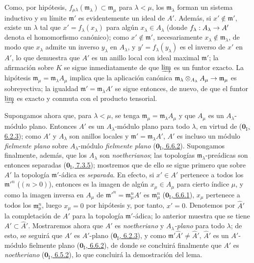 \documentclass[10pt,oneside,openany]{book}
\theoremstyle{egaenv}\newtheorem*{env}{---}
\theoremstyle{egastatement}
\theoremstyle{egadescription}
\newcommand{\oldpage}[2][]{\marginnote{\normalfont\scriptsize\textbf{#1}\,|\,#2}\ignorespaces}
\renewcommand{\to}{\mathchoice{\longrightarrow}{\rightarrow}{\rightarrow}{\rightarrow}}
\begin{document}
Como, por hipótesis, $f_{\mu\lambda}(\mathfrak m_\lambda)\subset\mathfrak m_\mu$ para $\lambda<\mu$, los $\mathfrak m_\lambda$ forman un sistema inductivo y su límite $\mathfrak m'$ es evidentemente un ideal de $A'$.
Además, si $x'\notin\mathfrak m'$, existe un $\lambda$ tal que $x'=f_\lambda(x_\lambda)$ para algún $x_\lambda\in A_\lambda$ (donde $f_\lambda:A_\lambda\to A'$ denota el homomorfismo canónico);
como $x'\notin\mathfrak m'$, necesariamente $x_\lambda\notin\mathfrak m_\lambda$, de modo que $x_\lambda$ admite un inverso $y_\lambda$ en $A_\lambda$, y $y'=f_\lambda(y_\lambda)$ es el inverso de $x'$ en $A'$, lo que demuestra que $A'$ es un anillo local con ideal maximal $\mathfrak m'$;
la afirmación sobre $K$ se sigue inmediatamente de que $\varinjlim$ es un funtor exacto.
La hipótesis $\mathfrak m_\mu=\mathfrak m_\lambda A_\mu$ implica que la aplicación canónica $\mathfrak m_\lambda\otimes_{A_\lambda}A_\mu\to\mathfrak m_\mu$ es sobreyectiva;
la igualdad $\mathfrak m'=\mathfrak m_\lambda A'$ se sigue entonces, de nuevo, de que el funtor $\varinjlim$ es exacto y conmuta con el producto tensorial.

Supongamos ahora que, para $\lambda<\mu$, se tenga $\mathfrak m_\mu=\mathfrak m_\lambda A_\mu$ y que $A_\mu$ es un $A_\lambda$-módulo plano.
Entonces $A'$ es un $A_\lambda$-módulo plano para todo $\lambda$, en virtud de (\hyperref[0.6.2.3-fr]{$\mathbf{0}_{\mathrm I}$, 6.2.3}); como $A'$ y $A_\lambda$ son anillos locales y $\mathfrak m'=\mathfrak m_\lambda A'$,
$A'$ es incluso un módulo \emph{fielmente plano} sobre $A_\lambda$-módulo \emph{fielmente plano} (\hyperref[0.6.6.2-fr]{$\mathbf{0}_{\mathrm I}$, 6.6.2}). Supongamos finalmente, además, que los $A_\lambda$ son \emph{noetherianos};
las topologías $\mathfrak m_\lambda$-preádicas son entonces separadas (\hyperref[0.7.3.5-fr]{$\mathbf{0}_{\mathrm I}$, 7.3.5}); mostremos que de ello se sigue primero que sobre $A'$ la topología $\mathfrak m'$-ádica es \emph{separada}. En efecto, si $x'\in A'$ pertenece a todos los $\mathfrak m'^{n}$ ($(n>0)$), entonces es la imagen de algún $x_\mu\in A_\mu$ para cierto índice $\mu$, y como la imagen inversa en $A_\mu$ de $\mathfrak m'^{n}=\mathfrak m_\mu^n A'$ es $\mathfrak m_\mu^n$
(\hyperref[0.6.6.1-fr]{$\mathbf{0}_{\mathrm I}$, 6.6.1}), $x_\mu$ pertenece a todos los $\mathfrak m_\mu^n$, luego $x_\mu=0$ por hipótesis y, por tanto, $x'=0$.
Denotemos por $\widehat A'$ la completación de $A'$ para la topología $\mathfrak m'$-ádica;
lo anterior muestra que se tiene $A'\subset\widehat A'$.
Mostraremos ahora que $\widehat A'$ es \emph{noetheriano} y \emph{$A_\lambda$-plano} para todo $\lambda$;
de esto,
\oldpage[0\textsubscript{III}]{22}
se seguirá que $\widehat A'$ es $A'$-plano (\hyperref[0.6.2.3-fr]{$\mathbf{0}_{\mathrm I}$, 6.2.3}), y como $\mathfrak m'\widehat A'\ne\widehat A'$,
$\widehat A'$ es un $A'$-módulo fielmente plano (\hyperref[0.6.6.2-fr]{$\mathbf{0}_{\mathrm I}$, 6.6.2}), de donde se concluirá finalmente que $A'$ es \emph{noetheriano} (\hyperref[0.6.5.2-fr]{$\mathbf{0}_{\mathrm I}$, 6.5.2}), lo que concluirá la demostración del lema.
\end{document}
